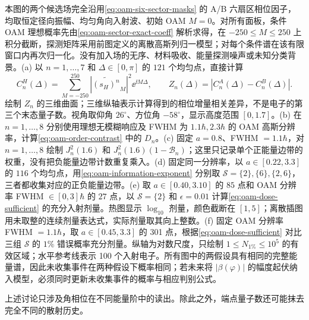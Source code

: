 本图的两个候选场完全沿用\cref{eq:oam-six-sector-masks} 的 A/B 六扇区相位因子，均取恒定径向振幅、均匀角向入射波、初始 OAM $M=0$。对所有面板，条件 OAM 理想概率先由\cref{eq:oam-sector-exact-coeff} 解析求得，在 $-250\le M\le250$ 上积分截断，探测矩阵采用前图定义的离散高斯列归一模型；对每个条件谱在该有限窗口内再次归一化。没有加入场的无序、材料吸收、能量探测噪声或未知分类背景。(a) 以 $n=1,\ldots,7$ 和 $\Delta\in[0,\pi]$ 的 $121$ 个均匀点，直接计算
\[
 C_n^H(\Delta)=\sum_{M=-250}^{250}
 |\widetilde{(s_H)^n}_M|^2\ee^{\ii M\Delta},\qquad
 Z_n(\Delta)=|C_n^A(\Delta)-C_n^B(\Delta)|.
\]
绘制 $Z_n$ 的三维曲面；三维纵轴表示计算得到的相位增量相关差异，不是电子的第三个末态量子数。视角取仰角 $26^\circ$、方位角 $-58^\circ$，显示高度范围 $[0,1.7]$。(b) 在 $n=1,\ldots,8$ 分别使用理想无模糊响应及 FWHM 为 $1.1\hbar,2.3\hbar$ 的 OAM 高斯分辨率，计算\cref{eq:oam-order-contrast} 中的 $D_n$。(c) 固定 $a=0.8$、FWHM $=1.1\hbar$，对 $n=1,\ldots,8$ 绘制 $J_n^2(1.6)$ 和 $J_n^2(1.6)(1-\mathcal B_n)$；这里只记录单个正能量边带的权重，没有把负能量边带计数重复乘入。(d) 固定同一分辨率，以 $a\in[0.22,3.3]$ 的 $116$ 个均匀点，用\cref{eq:oam-information-exponent} 分别取 $\mathcal S=\{2\},\{6\},\{2,6\}$，三者都收集对应的正负能量边带。(e) 取 $a\in[0.40,3.10]$ 的 $85$ 点和 OAM 分辨率 FWHM $\in[0,3]\hbar$ 的 $27$ 点，以 $\mathcal S=\{2\}$ 和 $\epsilon=0.01$ 计算\cref{eq:oam-dose-sufficient} 的充分入射剂量。热图显示 $\log_{10}$ 剂量，颜色截断在 $[1,5]$；离散插图用未取整的连续剂量表达式，实际剂量取其向上整数。(f) 固定 OAM 分辨率 FWHM $=1.1\hbar$，取 $a\in[0.45,3.3]$ 的 301 点，根据\cref{eq:oam-dose-sufficient} 对比三组 $\mathcal S$ 的 $1\%$ 错误概率充分剂量。纵轴为对数尺度，只绘制 $1\leq N_{1\%}\leq10^5$ 的有效区域；水平参考线表示 100 个入射电子。所有图中的两假设具有相同的完整能量谱，因此未收集事件在两种假设下概率相同；若未来将 $|\beta(\varphi)|$ 的幅度起伏纳入模型，必须同时更新未收集事件的概率与相应判别公式。


上述讨论只涉及角相位在不同能量阶中的读出。除此之外，端点量子数还可能抹去完全不同的散射历史。

